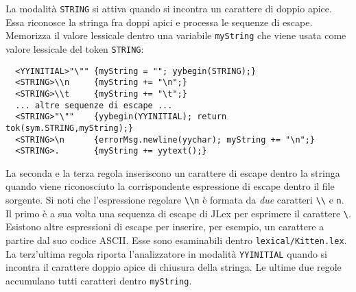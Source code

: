 La modalit\`a \texttt{STRING} si attiva quando si incontra
un carattere di doppio apice. Essa riconosce la stringa fra doppi apici e
processa le sequenze di escape. Memorizza il valore lessicale dentro una
variabile \texttt{myString} che viene usata come valore lessicale del
token \texttt{STRING}:
%
\begin{verbatim}
  <YYINITIAL>"\"" {myString = ""; yybegin(STRING);}
  <STRING>\\n     {myString += "\n";}
  <STRING>\\t     {myString += "\t";}
  ... altre sequenze di escape ...
  <STRING>"\""    {yybegin(YYINITIAL); return tok(sym.STRING,myString);}
  <STRING>\n      {errorMsg.newline(yychar); myString += "\n";}
  <STRING>.       {myString += yytext();}
\end{verbatim}
%
La seconda e la terza regola inseriscono un carattere di escape
dentro la stringa quando viene riconosciuto la corrispondente
espressione di escape dentro il file sorgente. Si noti che l'espressione
regolare \verb!\\n! \`e formata da \emph{due} caratteri \verb!\\! e \texttt{n}.
Il primo \`e a sua volta una sequenza di escape di JLex per
esprimere il carattere \verb!\!. Esistono altre espressioni di escape
per inserire, per esempio, un carattere a partire dal suo codice ASCII.
Esse sono esaminabili dentro \texttt{lexical/Kitten.lex}.
La terz'ultima regola riporta l'analizzatore in modalit\`a \texttt{YYINITIAL}
quando si incontra il carattere doppio apice di chiusura della stringa.
Le ultime due regole accumulano tutti caratteri dentro \texttt{myString}.
%
%
